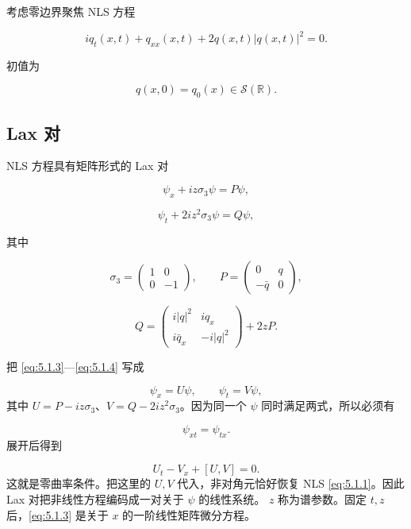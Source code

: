 \documentclass[
    lang=cn,
    scheme=chinese,
    mode=simple,
    device=normal,
    color=blue,
    math=cm,
    thmcnt=section,
    12pt
]{elegantbook}
\begin{document}
考虑零边界聚焦 NLS 方程

\begin{equation}
    iq_t(x,t)+q_{xx}(x,t)+2q(x,t)\lvert q(x,t)\rvert^2=0.
    \tag{5.1.1}
    \label{eq:5.1.1}
\end{equation}

初值为

\begin{equation}
    q(x,0)=q_0(x)\in\mathcal S(\mathbb{R}).
    \tag{5.1.2}
    \label{eq:5.1.2}
\end{equation}


\subsection{Lax 对}

NLS 方程具有矩阵形式的 Lax 对

\begin{equation}
    \psi_x+iz\sigma_3\psi=P\psi,
    \tag{5.1.3}
    \label{eq:5.1.3}
\end{equation}

\begin{equation}
    \psi_t+2iz^2\sigma_3\psi=Q\psi,
    \tag{5.1.4}
    \label{eq:5.1.4}
\end{equation}

其中

\[
    \sigma_3=
    \begin{pmatrix}
        1 & 0  \\
        0 & -1
    \end{pmatrix},
    \qquad
    P=
    \begin{pmatrix}
        0       & q \\
        -\bar q & 0
    \end{pmatrix},
\]

\[
    Q=
    \begin{pmatrix}
        i\lvert q\rvert^2 & iq_x               \\
        i\bar q_x         & -i\lvert q\rvert^2
    \end{pmatrix}
    +2zP.
\]

\begin{callout}
    把 \eqref{eq:5.1.3}---\eqref{eq:5.1.4} 写成

    \[
        \psi_x=U\psi,\qquad \psi_t=V\psi,
    \]
    其中 $U=P-iz\sigma_3$、$V=Q-2iz^2\sigma_3$。因为同一个 $\psi$ 同时满足两式，所以必须有

    \[
        \psi_{xt}=\psi_{tx}.
    \]
    展开后得到

    \[
        U_t-V_x+[U,V]=0.
    \]
    这就是零曲率条件。把这里的 $U,V$ 代入，非对角元恰好恢复 NLS \eqref{eq:5.1.1}。因此 Lax 对把非线性方程编码成一对关于 $\psi$ 的线性系统。
    $z$ 称为谱参数。固定 $t,z$ 后，\eqref{eq:5.1.3} 是关于 $x$ 的一阶线性矩阵微分方程。
\end{callout}
\end{document}
